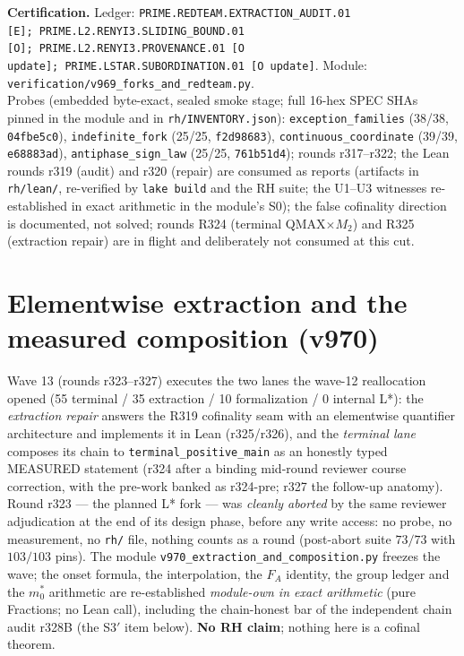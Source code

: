 \documentclass[11pt]{article}
\newcommand{\certbox}[3]{%
  \par\medskip\noindent\colorbox{certgray}{\parbox{\dimexpr\linewidth-2\fboxsep}{%
    \footnotesize\raggedright\textbf{Certification.} Ledger: \texttt{#1}.\quad
    Module: \texttt{#2}.\\ #3}}\par\medskip}
\theoremstyle{definition}
\theoremstyle{remark}
\begin{document}
\certbox{PRIME.REDTEAM.EXTRACTION\_AUDIT.01 [E];\
PRIME.L2.RENYI3.SLIDING\_BOUND.01 [O];\
PRIME.L2.RENYI3.PROVENANCE.01 [O update];\
PRIME.LSTAR.SUBORDINATION.01 [O update]}%
{verification/v969\_forks\_and\_redteam.py}%
{Probes (embedded byte-exact, sealed smoke stage; full 16-hex SPEC
SHAs pinned in the module and in \texttt{rh/INVENTORY.json}):
\texttt{exception\_families} (38/38, \texttt{04fbe5c0}),
\texttt{indefinite\_fork} (25/25, \texttt{f2d98683}),
\texttt{continuous\_coordinate} (39/39, \texttt{e68883ad}),
\texttt{antiphase\_sign\_law} (25/25, \texttt{761b51d4});
rounds r317--r322; the Lean rounds r319 (audit) and r320 (repair)
are consumed as reports (artifacts in \texttt{rh/lean/}, re-verified
by \texttt{lake build} and the RH suite; the U1--U3 witnesses
re-established in exact arithmetic in the module's S0); the false
cofinality direction is documented, not solved; rounds R324
(terminal QMAX$\times M_2$) and R325 (extraction repair) are in
flight and deliberately not consumed at this cut.}

\section{Elementwise extraction and the measured composition
(v970)}\label{sec:elementwise-extraction}

Wave 13 (rounds r323--r327) executes the two lanes the wave-12
reallocation opened (55 terminal / 35 extraction / 10 formalization
/ 0 internal L*): the \emph{extraction repair} answers the R319
cofinality seam with an elementwise quantifier architecture and
implements it in Lean (r325/r326), and the \emph{terminal lane}
composes its chain to \texttt{terminal\_positive\_main} as an
honestly typed MEASURED statement (r324 after a binding mid-round
reviewer course correction, with the pre-work banked as r324-pre;
r327 the follow-up anatomy).  Round r323 --- the planned L* fork ---
was \emph{cleanly aborted} by the same reviewer adjudication at the
end of its design phase, before any write access: no probe, no
measurement, no \texttt{rh/} file, nothing counts as a round
(post-abort suite $73/73$ with $103/103$ pins).  The module
\texttt{v970\_extraction\_and\_composition.py} freezes the wave;
the onset formula, the interpolation, the $F_A$ identity, the group
ledger and the $m_0^*$ arithmetic are re-established
\emph{module-own in exact arithmetic} (pure Fractions; no Lean
call), including the chain-honest bar of the independent chain
audit r328B (the S3$'$ item below).  \textbf{No RH claim}; nothing
here is a cofinal theorem.
\end{document}
